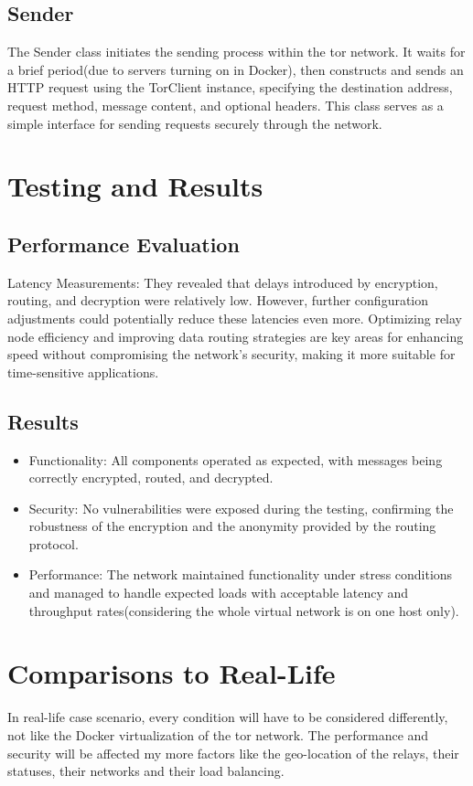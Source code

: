 \documentclass[sigconf]{acmart}
\begin{document}
\subsection{Sender}
The Sender class initiates the sending process within the tor network. It waits for a brief period(due to servers turning on in Docker), then constructs and sends an HTTP request using the TorClient instance, specifying the destination address, request method, message content, and optional headers. This class serves as a simple interface for sending requests securely through the network.

\section{Testing and Results}
\subsection{Performance Evaluation}
Latency Measurements: They revealed that delays introduced by encryption, routing, and decryption were relatively low. However, further configuration adjustments could potentially reduce these latencies even more. Optimizing relay node efficiency and improving data routing strategies are key areas for enhancing speed without compromising the network's security, making it more suitable for time-sensitive applications.
\subsection{Results}
\begin{itemize}
    \item Functionality: All components operated as expected, with messages being correctly encrypted, routed, and decrypted.
    \item Security: No vulnerabilities were exposed during the testing, confirming the robustness of the encryption and the anonymity provided by the routing protocol.
    \item Performance: The network maintained functionality under stress conditions and managed to handle expected loads with acceptable latency and throughput rates(considering the whole virtual network is on one host only).
\end{itemize}


\section{Comparisons to Real-Life}
In real-life case scenario, every condition will have to be considered differently, not like the Docker virtualization of the tor network. The performance and security will be affected my more factors like the geo-location of the relays, their statuses, their networks and their load balancing.
\end{document}
